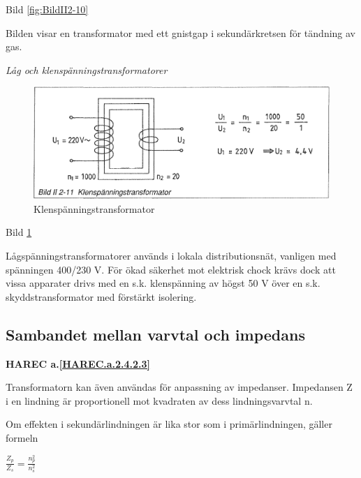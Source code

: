 Bild \ref{fig:BildII2-10}

Bilden visar en transformator med ett gnistgap i sekundärkretsen för tändning av
gas.

\emph{Låg och klenspänningstransformatorer}

\begin{figure}[h]
\begin{center}
\includegraphics[width=14cm]{images/bild_2_2-11}
\caption{Klenspänningstransformator}
\label{fig:BildII2-11}
\end{center}
\end{figure}

Bild \ref{fig:BildII2-11}

Lågspänningstransformatorer används i lokala distributionsnät, vanligen med
spänningen 400/230 V. För ökad säkerhet mot elektrisk chock krävs dock att vissa
apparater drivs med en s.k. klenspänning av högst 50 V över en s.k.
skyddstransformator med förstärkt isolering.

\subsection{Sambandet mellan varvtal och impedans}
\textbf{HAREC a.\ref{HAREC.a.2.4.2.3}\label{myHAREC.a.2.4.2.3}}

Transformatorn kan även användas för anpassning av impedanser. Impedansen Z i en
lindning är proportionell mot kvadraten av dess lindningsvarvtal n.

Om effekten i sekundärlindningen är lika stor som i primärlindningen, gäller
formeln

\(\frac{Z_p}{Z_s} = \frac{n_p^2}{n_s^2}\)
